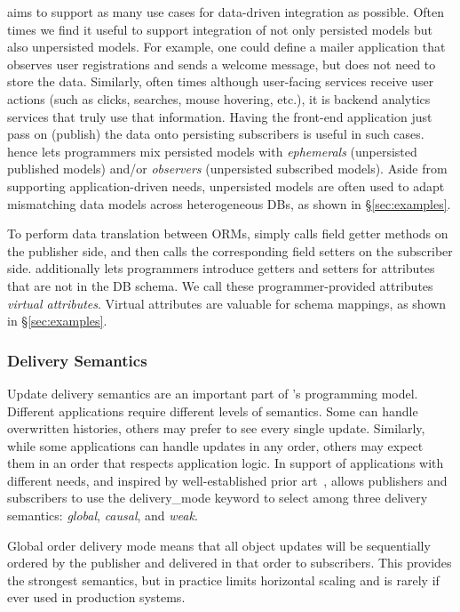  \synapse aims to support as many use cases
for data-driven integration as possible.  Often times we find it useful to
support integration of not only persisted models but also unpersisted models.
For example, one could define a mailer application that observes user
registrations and sends a welcome message, but does not need to store the data.
Similarly, often times although user-facing services receive user actions
(such as clicks, searches, mouse hovering, etc.), it is backend analytics
services that truly use that information.  Having the front-end application just
pass on (publish) the data onto persisting subscribers is useful in such cases.
\synapse hence lets programmers mix persisted models with {\em ephemerals}
(unpersisted published models)
and/or {\em observers} (unpersisted subscribed models).  Aside from
supporting application-driven needs, unpersisted models are often used to
adapt mismatching data models across heterogeneous DBs, as shown in
\S\ref{sec:examples}.

 To perform data translation between ORMs,
\synapse simply calls field getter methods on the publisher side, and then
calls the corresponding field setters on the subscriber side. \synapse
additionally lets programmers introduce getters and setters for attributes
that are not in the DB schema.  We call these programmer-provided attributes
{\em virtual attributes}. Virtual attributes are valuable for schema mappings,
as shown in \S\ref{sec:examples}.

\endgroup

\subsubsection{\synapse Delivery Semantics}
\label{sec:semantics}
Update delivery semantics are an
important part of \synapse's programming model. Different applications
require different levels of semantics.  Some can handle overwritten histories,
others may prefer to see every single update.  Similarly, while some
applications can handle updates in any order, others may expect them in an
order that respects application logic. In support of applications with
different needs, and inspired by well-established prior
art~\cite{Lamport:1978:TCO:359545.359563}, \synapse allows
publishers and subscribers to use the {\code delivery\_mode} keyword
to select among three delivery semantics: {\em global},
{\em causal}, and {\em weak}.  

Global order delivery mode means that all object updates will be
sequentially ordered by the publisher and delivered in that order to
subscribers.  This provides the strongest semantics, but
in practice limits horizontal scaling and is rarely if ever used in
production systems.  

